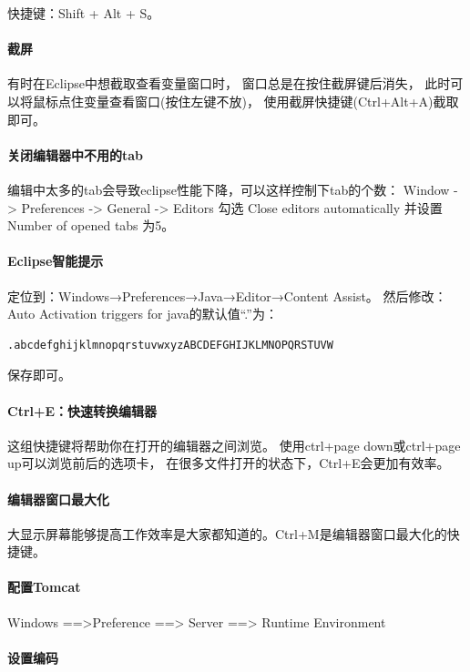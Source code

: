 \documentclass{book}
\begin{document}
快捷键：Shift + Alt + S。

\paragraph{截屏}
有时在Eclipse中想截取查看变量窗口时，
窗口总是在按住截屏键后消失，
此时可以将鼠标点住变量查看窗口(按住左键不放)，
使用截屏快捷键(Ctrl+Alt+A)截取即可。

\paragraph{关闭编辑器中不用的tab}
编辑中太多的tab会导致eclipse性能下降，可以这样控制下tab的个数：
Window -> Preferences -> General -> Editors
勾选 Close editors automatically 并设置 Number of opened tabs 为5。

\paragraph{Eclipse智能提示}

定位到：Windows→Preferences→Java→Editor→Content Assist。
然后修改：Auto Activation triggers for java的默认值“.”为：

\begin{lstlisting}
.abcdefghijklmnopqrstuvwxyzABCDEFGHIJKLMNOPQRSTUVW
\end{lstlisting}

保存即可。

\paragraph{Ctrl+E：快速转换编辑器}

这组快捷键将帮助你在打开的编辑器之间浏览。
使用ctrl+page down或ctrl+page up可以浏览前后的选项卡，
在很多文件打开的状态下，Ctrl+E会更加有效率。

\paragraph{编辑器窗口最大化}
大显示屏幕能够提高工作效率是大家都知道的。Ctrl+M是编辑器窗口最大化的快捷键。

\paragraph{配置Tomcat}
Windows ==>Preference ==> Server ==> Runtime Environment

\paragraph{设置编码}
\end{document}
